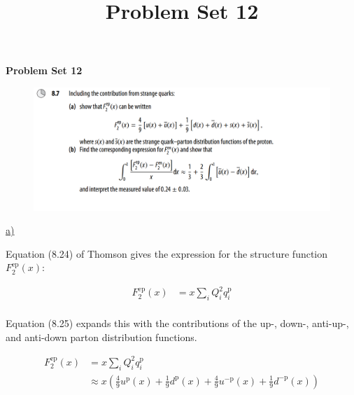 \documentclass[11pt]{article}
\theoremstyle{definition}
\begin{document}
\setcounter{section}{2}
\title{Problem Set 12}

\pagestyle{fancy}
\fancyhf{}

\begin{center}
{\LARGE \bf Problem Set 12}\\
\end{center}

\begin{figure}[H]
    \centering
    \includegraphics[scale = 0.4]{8.7.png}
\end{figure}

\underline{a)}

Equation (8.24) of Thomson gives the expression for the structure function $F_{2}^{\text{ep}}(x)$:

\begin{align}
    F_{2}^{\text{ep}}(x) &= x \sum_{i} Q_i^2q_i^{\text{p}}\\
\end{align}

Equation (8.25) expands this with the contributions of the up-, down-, anti-up-, and anti-down parton distribution functions. 

\begin{align}
    F_{2}^{\text{ep}}(x) &= x \sum_{i} Q_i^2q_i^{\text{p}}\\
    &\approx x\left( \frac{4}{9} u^{\text{p}}(x) + \frac{1}{9}d^{\text{p}}(x) + \frac{4}{9} u^{-\text{p}}(x) + \frac{1}{9} d^{-\text{p}}(x)  \right)
\end{align}
\end{document}
